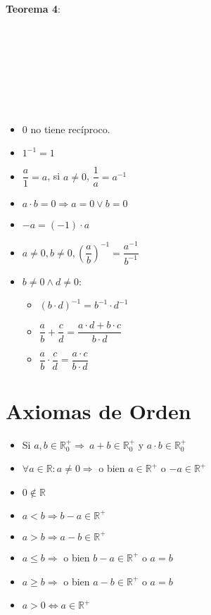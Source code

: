 \documentclass[11pt,a4paper]{article}
\begin{document}
\begin{multicols}{3}
\noindent \textbf{Teorema 4}:\\ \\ \\ \\ \\ \\ \\ \\

\begin{itemize}
\item $0$ no tiene rec\'iproco.
\item $1^{-1} = 1$
\item $\dfrac{a}{1} = a$, si $a \not = 0$, $\dfrac{1}{a} = a^{-1}$
\item $a\cdot b = 0 \Rightarrow a=0 \lor b=0$
\item $-a = (-1) \cdot a$
\item $a\not = 0, b\not = 0, \left(\dfrac{a}{b}\right)^{-1} = \dfrac{a^{-1}}{b^{-1}}$
\item $b \not = 0 \land d \not = 0$:
\begin{itemize}
\item $(b\cdot d)^{-1} = b^{-1} \cdot d^{-1}$
\item $\dfrac{a}{b}+\dfrac{c}{d} = \dfrac{a\cdot d + b\cdot c}{b\cdot d}$
\item $\dfrac{a}{b} \cdot \dfrac{c}{d} = \dfrac{a\cdot c}{b \cdot d}$
\end{itemize}
\end{itemize}
\end{multicols}

\section{Axiomas de Orden}
\begin{itemize}
\item Si $a,b \in \mathbb{R}^+_0 \Rightarrow\ a+b \in \mathbb{R}^+_0$ y $a \cdot b \in \mathbb{R}^+_0$
\item $\forall a \in \mathbb{R} : a \not = 0 \Rightarrow$ o bien $a \in \mathbb{R}^+$ o $-a \in \mathbb{R}^+$
\item $0 \not \in \mathbb{R}$
\end{itemize}
\noindent \dotfill
\begin{itemize}
\item $a < b \Rightarrow b - a \in \mathbb{R}^+$
\item $a > b \Rightarrow a - b \in \mathbb{R}^+$
\item $a \leq b \Rightarrow$ o bien $b - a \in \mathbb{R}^+$ o $a = b$
\item $a \geq b \Rightarrow$ o bien $a - b \in \mathbb{R}^+$ o $a = b$
\item $a > 0 \iff a \in \mathbb{R}^+$
\end{itemize}
\end{document}

